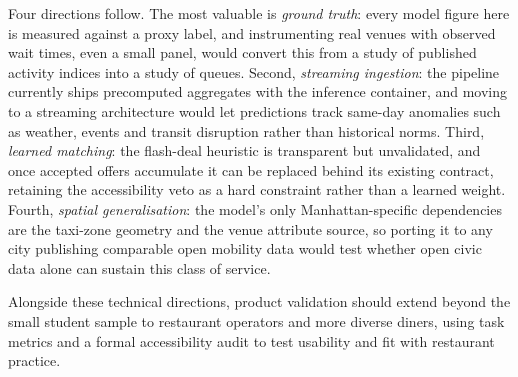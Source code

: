 \documentclass[conference]{IEEEtran}
\begin{document}
Four directions follow. The most valuable is \emph{ground truth}: every model figure here is measured against a proxy label, and instrumenting real venues with observed wait times, even a small panel, would convert this from a study of published activity indices into a study of queues. Second, \emph{streaming ingestion}: the pipeline currently ships precomputed aggregates with the inference container, and moving to a streaming architecture would let predictions track same-day anomalies such as weather, events and transit disruption rather than historical norms. Third, \emph{learned matching}: the flash-deal heuristic is transparent but unvalidated, and once accepted offers accumulate it can be replaced behind its existing contract, retaining the accessibility veto as a hard constraint rather than a learned weight. Fourth, \emph{spatial generalisation}: the model's only Manhattan-specific dependencies are the taxi-zone geometry and the venue attribute source, so porting it to any city publishing comparable open mobility data would test whether open civic data alone can sustain this class of service.

Alongside these technical directions, product validation should extend beyond the small student sample to restaurant operators and more diverse diners, using task metrics and a formal accessibility audit to test usability and fit with restaurant practice.



\end{document}
